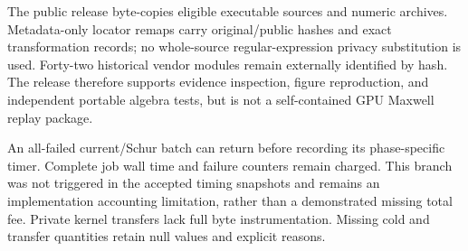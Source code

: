 The public release byte-copies eligible executable sources and numeric archives. Metadata-only locator remaps carry original/public hashes and exact transformation records; no whole-source regular-expression privacy substitution is used. Forty-two historical vendor modules remain externally identified by hash. The release therefore supports evidence inspection, figure reproduction, and independent portable algebra tests, but is not a self-contained GPU Maxwell replay package.

An all-failed current/Schur batch can return before recording its phase-specific timer. Complete job wall time and failure counters remain charged. This branch was not triggered in the accepted timing snapshots and remains an implementation accounting limitation, rather than a demonstrated missing total fee. Private kernel transfers lack full byte instrumentation. Missing cold and transfer quantities retain null values and explicit reasons.
